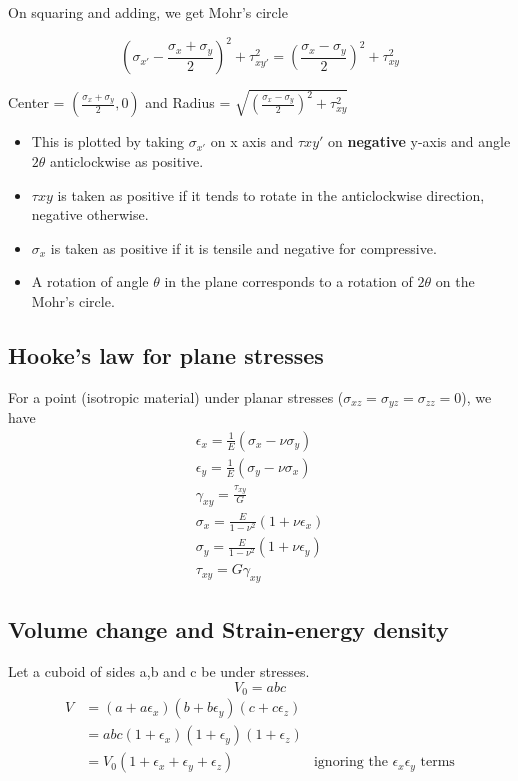 \documentclass{article}
\begin{document}
	On squaring and adding, we get Mohr's circle

	\[\left(\sigma_{x'} -\frac{\sigma_x+\sigma_y}{2} \right)^2 + \tau_{xy'}^2 = \left(\frac{\sigma_x - \sigma_y}{2}\right)^2 + \tau_{xy}^2 \] 

	Center = $(\frac{\sigma_x+\sigma_y}{2},0)$ and 
	Radius = $\sqrt{\left(\frac{\sigma_x - \sigma_y}{2}\right)^2 + \tau_{xy}^2}$\\

	\begin{itemize}
		\item This is plotted by taking $\sigma_{x'}$ on x axis and $\tau{xy'}$ on \textbf{negative} y-axis and angle $2\theta$ anticlockwise as positive.\\
		\item $\tau{xy}$ is taken as positive if it tends to rotate in the anticlockwise direction, negative otherwise.
		\item $\sigma_x$ is taken as positive if it is tensile and negative for compressive.
		\item A rotation of angle $\theta$ in the plane corresponds to a rotation of $2\theta$ on the Mohr's circle.
	\end{itemize}


	\subsection{Hooke's law for plane stresses }
	For a point (isotropic material) under planar stresses ($\sigma_{xz}=\sigma_{yz}=\sigma_{zz} =0$), we have
	\begin{gather*}
		\epsilon_x = \frac{1}{E} (\sigma_x - \nu \sigma_y)\\
		\epsilon_y = \frac{1}{E} (\sigma_y - \nu \sigma_x)\\
		\gamma_{xy} = \frac{\tau_{xy}}{G}\\
		\sigma_x = \frac{E}{1-\nu^2} (1+\nu \epsilon_x)\\
		\sigma_y = \frac{E}{1-\nu^2} (1+\nu \epsilon_y)\\
		\tau_{xy} = G \gamma_{xy}
	\end{gather*}



	\subsection{Volume change and Strain-energy density}
		Let a cuboid of sides a,b and c be under stresses. 
		\[V_0 = abc\]
		\begin{align*}
		V &= (a+a\epsilon_x) (b+b\epsilon_y)  (c+c\epsilon_z)\\
		  &= abc(1+\epsilon_x) (1+\epsilon_y)  (1+\epsilon_z)\\ 
		  &= V_0 (1+\epsilon_x +\epsilon_y + \epsilon_z ) &\text{ignoring the $\epsilon_x\epsilon_y$ terms}
		\end{align*}
\end{document}
